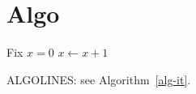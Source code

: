 \section{Algo}
\begin{algorithm}
\caption{Iterate $x$}\label{alg-it}
\begin{algorithmic}[1]
\State Fix $x=0$
\State $x \gets x + 1$
\EndWhile
\end{algorithmic}
\end{algorithm}
ALGOLINES: see Algorithm~\ref{alg-it}.

